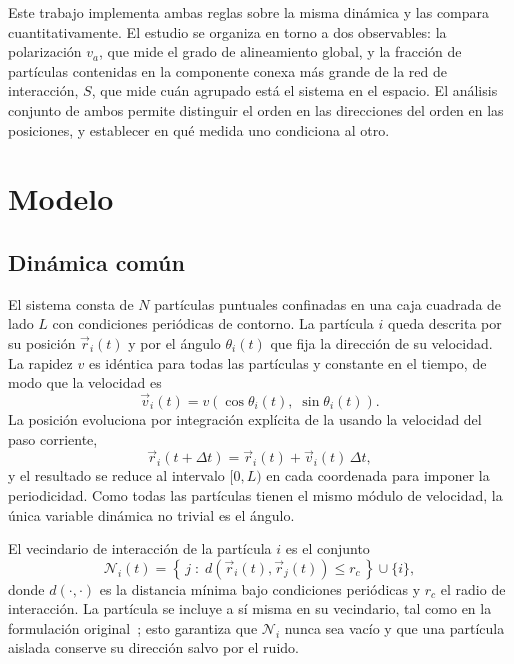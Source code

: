 \documentclass[11pt,a4paper]{article}
\begin{document}
Este trabajo implementa ambas reglas sobre la misma dinámica y las compara
cuantitativamente. El estudio se organiza en torno a dos observables: la
polarización $v_a$, que mide el grado de alineamiento global, y la fracción de
partículas contenidas en la componente conexa más grande de la red de
interacción, $S$, que mide cuán agrupado está el sistema en el espacio. El
análisis conjunto de ambos permite distinguir el orden en las direcciones del
orden en las posiciones, y establecer en qué medida uno condiciona al otro.

\section{Modelo}
\label{sec:modelo}

\subsection{Dinámica común}

El sistema consta de $N$ partículas puntuales confinadas en una caja cuadrada de
lado $L$ con condiciones periódicas de contorno. La partícula $i$ queda descrita
por su posición $\vec{r}_i(t)$ y por el ángulo $\theta_i(t)$ que fija la
dirección de su velocidad. La rapidez $v$ es idéntica para todas las partículas
y constante en el tiempo, de modo que la velocidad es
%
\begin{equation}
\label{eq:velocidad}
\vec{v}_i(t) = v\left(\cos\theta_i(t),\; \sin\theta_i(t)\right).
\end{equation}
%
La posición evoluciona por integración explícita de la 
usando la velocidad del paso corriente,
%
\begin{equation}
\label{eq:posicion}
\vec{r}_i(t+\Delta t) = \vec{r}_i(t) + \vec{v}_i(t)\,\Delta t,
\end{equation}
%
y el resultado se reduce al intervalo $[0,L)$ en cada coordenada para imponer la
periodicidad. Como todas las partículas tienen el mismo módulo de velocidad, la
única variable dinámica no trivial es el ángulo.

El vecindario de interacción de la partícula $i$ es el conjunto
%
\begin{equation}
\label{eq:vecindario}
\mathcal{N}_i(t) = \left\{\, j \;:\; d\!\left(\vec{r}_i(t), \vec{r}_j(t)\right) \le r_c \,\right\} \cup \{i\},
\end{equation}
%
donde $d(\cdot,\cdot)$ es la distancia mínima bajo condiciones periódicas y
$r_c$ el radio de interacción. La partícula se incluye a sí misma en su
vecindario, tal como en la formulación original~\cite{vicsek1995}; esto garantiza
que $\mathcal{N}_i$ nunca sea vacío y que una partícula aislada conserve su
dirección salvo por el ruido.
\end{document}
